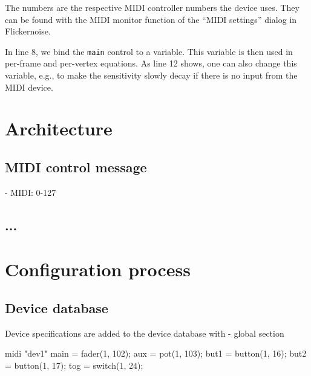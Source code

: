 \documentclass[11pt,a4paper]{article}
\begin{document}
The numbers are the respective MIDI controller numbers the device uses.
They can be found with the MIDI monitor function of the ``MIDI settings''
dialog in Flickernoise.

In line 8, we bind the {\tt main} control to a variable. This variable is
then used in per-frame and per-vertex equations. As line 12 shows, one
can also change this variable, e.g., to make the sensitivity slowly decay
if there is no input from the MIDI device.




\section{Architecture}




\subsection{MIDI control message}

- MIDI: 0-127




\subsection{...}



\section{Configuration process}



\subsection{Device database}

Device specifications are added to the device database with 
- global section

\begin{listing}{1}
midi "dev1" {
	main = fader(1, 102);
	aux = pot(1, 103);
	but1 = button(1, 16);
	but2 = button(1, 17);
	tog = switch(1, 24);
}
\end{listing}
\end{document}
